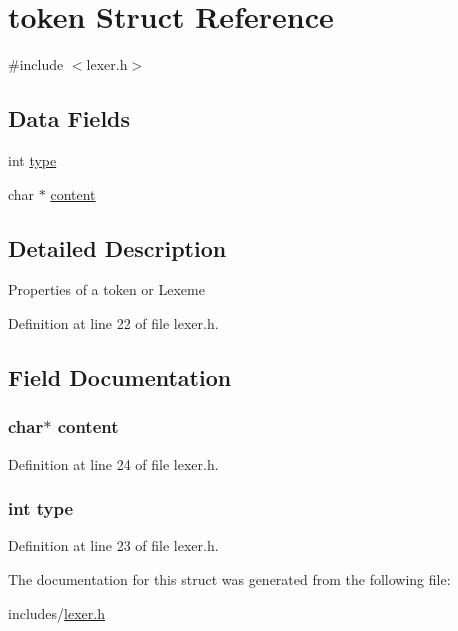 \hypertarget{structtoken}{\section{token Struct Reference}
\label{structtoken}
}


{\ttfamily \#include $<$lexer.\+h$>$}

\subsection*{Data Fields}
\begin{DoxyCompactItemize}
\item 
int \hyperlink{structtoken_ac765329451135abec74c45e1897abf26}{type}
\item 
char $\ast$ \hyperlink{structtoken_ab0746fb6288bd31fd0d505fab48d8785}{content}
\end{DoxyCompactItemize}


\subsection{Detailed Description}
Properties of a token or Lexeme 

Definition at line 22 of file lexer.\+h.



\subsection{Field Documentation}
\hypertarget{structtoken_ab0746fb6288bd31fd0d505fab48d8785}{
\subsubsection[{content}]{\setlength{\rightskip}{0pt plus 5cm}char$\ast$ content}}\label{structtoken_ab0746fb6288bd31fd0d505fab48d8785}


Definition at line 24 of file lexer.\+h.

\hypertarget{structtoken_ac765329451135abec74c45e1897abf26}{
\subsubsection[{type}]{\setlength{\rightskip}{0pt plus 5cm}int type}}\label{structtoken_ac765329451135abec74c45e1897abf26}


Definition at line 23 of file lexer.\+h.



The documentation for this struct was generated from the following file\+:\begin{DoxyCompactItemize}
\item 
includes/\hyperlink{lexer_8h}{lexer.\+h}\end{DoxyCompactItemize}
